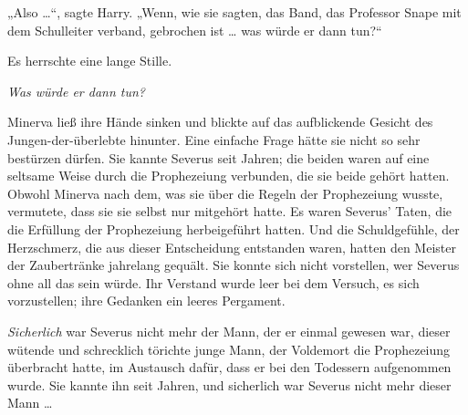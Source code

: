 „Also …“, sagte Harry.
„Wenn, wie sie sagten, das Band, das Professor Snape mit dem Schulleiter verband, gebrochen ist … was würde er dann tun?“

Es herrschte eine lange Stille.

\later

\emph{Was würde er dann tun?}

Minerva ließ ihre Hände sinken und blickte auf das aufblickende Gesicht des Jungen-der-überlebte hinunter. Eine einfache Frage hätte sie nicht so sehr bestürzen dürfen. Sie kannte Severus seit Jahren; die beiden waren auf eine seltsame Weise durch die Prophezeiung verbunden, die sie beide gehört hatten. Obwohl Minerva nach dem, was sie über die Regeln der Prophezeiung wusste, vermutete, dass sie sie selbst nur mitgehört hatte. Es waren Severus’ Taten, die die Erfüllung der Prophezeiung herbeigeführt hatten. Und die Schuldgefühle, der Herzschmerz, die aus dieser Entscheidung entstanden waren, hatten den Meister der Zaubertränke jahrelang gequält. Sie konnte sich nicht vorstellen, wer Severus ohne all das sein würde. Ihr Verstand wurde leer bei dem Versuch, es sich vorzustellen; ihre Gedanken ein leeres Pergament.

\emph{Sicherlich} war Severus nicht mehr der Mann, der er einmal gewesen war, dieser wütende und schrecklich törichte junge Mann, der Voldemort die Prophezeiung überbracht hatte, im Austausch dafür, dass er bei den Todessern aufgenommen wurde.
Sie kannte ihn seit Jahren, und sicherlich war Severus nicht mehr dieser Mann …

